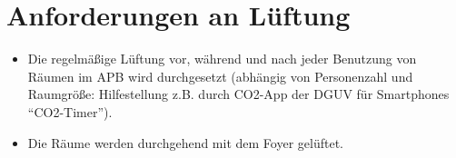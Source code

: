 \documentclass[12pt]{article}
\begin{document}
    \section{Anforderungen an Lüftung}
        \begin{itemize}
            \item Die regelmäßige Lüftung vor, während und nach jeder Benutzung von Räumen im APB wird durchgesetzt (abhängig von Personenzahl und Raumgröße: Hilfestellung z.B. durch CO2-App der DGUV für Smartphones ``CO2-Timer'').
            \item Die Räume werden durchgehend mit dem Foyer gelüftet.
        \end{itemize}
\end{document}
